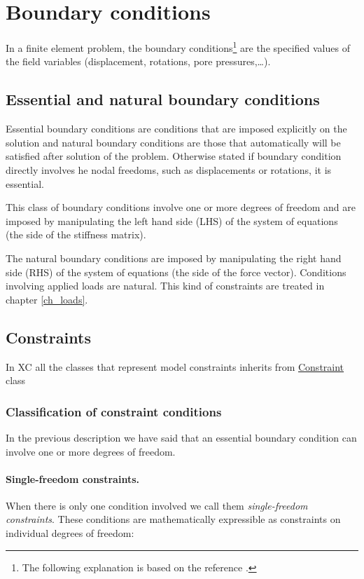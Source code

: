 \section{Boundary conditions}
In a finite element problem, the boundary conditions\footnote{The following explanation is based on the reference \cite{asen5007}.} are the specified values of the field variables (displacement, rotations, pore pressures,\ldots).

\subsection{Essential and natural boundary conditions}
Essential boundary conditions are conditions that are imposed explicitly on the solution and natural boundary conditions are those that automatically will be satisfied after solution of the problem. Otherwise stated if boundary condition directly involves he nodal freedoms, such as displacements or rotations, it is essential.

This class of boundary conditions involve one or more degrees of freedom and are imposed by manipulating the left hand side (LHS) of the system of equations (the side of the stiffness matrix).

The natural boundary conditions are imposed by manipulating the right hand side (RHS) of the system of equations (the side of the force vector). Conditions involving applied loads are natural. This kind of constraints are treated in chapter \ref{ch_loads}.

\subsection{Constraints}
In XC all the classes that represent model constraints inherits from \href{https://github.com/xcfem/xc/blob/master/src/domain/constraints/Constraint.h}{Constraint} class 

\subsubsection{Classification of constraint conditions}
In the previous  description we have said that an essential boundary condition can involve one or more degrees of freedom.

\paragraph{Single-freedom constraints.}
When there is only one condition involved we call them \emph{single-freedom constraints}. These conditions are mathematically expressible as constraints on individual degrees of freedom:

